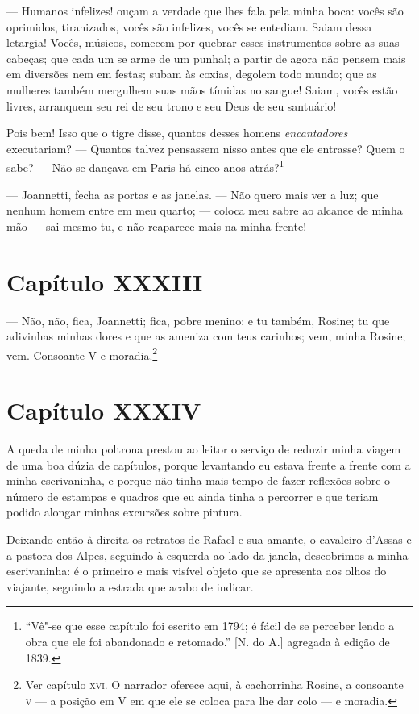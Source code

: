  --- Humanos infelizes! ouçam a verdade que lhes fala pela minha boca:
vocês são oprimidos, tiranizados, vocês são infelizes, vocês se
entediam. Saiam dessa letargia! Vocês, músicos, comecem por quebrar
esses instrumentos sobre as suas cabeças; que cada um se arme de um
punhal; a partir de agora não pensem mais em diversões nem em festas;
subam às coxias, degolem todo mundo; que as mulheres também mergulhem
suas mãos tímidas no sangue! Saiam, vocês estão livres, arranquem seu
rei de seu trono e seu Deus de seu santuário!

 Pois bem! Isso que o tigre disse, quantos desses homens
\textit{encantadores} executariam? --- Quantos talvez pensassem nisso
antes que ele entrasse? Quem o sabe? --- Não se dançava em Paris há
cinco anos atrás?\footnote{ ``Vê"-se que esse capítulo foi escrito em
1794; é fácil de se perceber lendo a obra que ele foi abandonado e
retomado.'' [N. do A.] agregada à edição de 1839.}

 --- Joannetti, fecha as portas e as janelas. --- Não quero mais ver a
luz; que nenhum homem entre em meu quarto; --- coloca meu sabre ao
alcance de minha mão --- sai mesmo tu, e não reaparece mais na minha
frente!

\section*{Capítulo XXXIII}

 --- Não, não, fica, Joannetti; fica, pobre menino: e tu também, Rosine;
tu que adivinhas minhas dores e que as ameniza com teus carinhos; vem,
minha Rosine; vem. Consoante V e moradia.\footnote{ Ver capítulo \textsc{xvi}. O
narrador oferece aqui, à cachorrinha Rosine, a consoante \textsc{v} --- a
posição em V em que ele se coloca para lhe dar colo --- e moradia.} 

\section*{Capítulo XXXIV}

 A queda de minha poltrona prestou ao leitor o serviço de reduzir minha
viagem de uma boa dúzia de capítulos, porque levantando eu estava
frente a frente com a minha escrivaninha, e porque não tinha mais tempo
de fazer reflexões sobre o número de estampas e quadros que eu ainda
tinha a percorrer e que teriam podido alongar minhas excursões sobre pintura.

 Deixando então à direita os retratos de Rafael e sua amante, o
cavaleiro d’Assas e a pastora dos Alpes, seguindo à esquerda ao lado da
janela, descobrimos a minha escrivaninha: é o primeiro e mais visível
objeto que se apresenta aos olhos do viajante, seguindo a estrada que
acabo de indicar.

